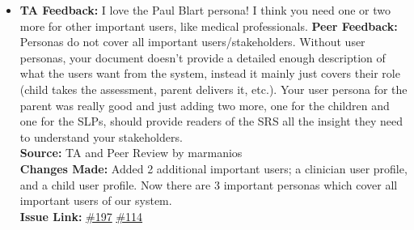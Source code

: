 \documentclass{article}
\begin{document}
\begin{itemize}
  \item
    \textbf{TA Feedback:} I love the Paul Blart persona! I think you need one or two more for other important users, like medical professionals.
    \textbf{Peer Feedback:} Personas do not cover all important users/stakeholders. Without user personas, your document doesn't provide a detailed enough description of what the users want from the system, instead it mainly just covers their role (child takes the assessment, parent delivers it, etc.). Your user persona for the parent was really good and just adding two more, one for the children and one for the SLPs, should provide readers of the SRS all the insight they need to understand your stakeholders. \\
    \textbf{Source:} TA and Peer Review by marmanios\\
    \textbf{Changes Made:} Added 2 additional important users; a clinician user profile, and a child user profile. Now there are 3 important personas which cover all important users of our system.\\
    \textbf{Issue Link:} \href{https://github.com/parishanizam/TeleHealth/issues/197}{\#197} \href{https://github.com/parishanizam/TeleHealth/issues/114}{\#114}

  \end{itemize}

\newpage
\end{document}
